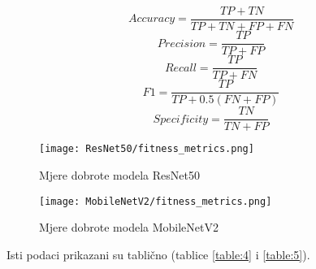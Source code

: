 \documentclass[conference, utf8]{IEEEtran}
\begin{document}
\begin{equation}
	Accuracy = \frac{TP + TN}{TP + TN + FP + FN} \label{eq:1}
\end{equation}
\begin{equation}
	Precision = \frac{TP}{TP + FP} \label{eq:2}
\end{equation}
\begin{equation}
	Recall = \frac{TP}{TP + FN} \label{eq:3}
\end{equation}
\begin{equation}
	F1 = \frac{TP}{TP + 0.5(FN + FP)}
\end{equation}
\begin{equation}
	Specificity = \frac{TN}{TN + FP} \label{eq:5}
\end{equation}


\begin{figure}[ht]
	\centering
	\texttt{[image: ResNet50/fitness\_metrics.png]}
	\caption{Mjere dobrote modela ResNet50}
	\label{fig:RN50_fit_met}
\end{figure}



\begin{figure}[ht]
  \centering
  \texttt{[image: MobileNetV2/fitness\_metrics.png]}
  \caption{Mjere dobrote modela MobileNetV2}
  \label{fig:MN_fit_met}
\end{figure}
\pagebreak
Isti podaci prikazani su tablično (tablice \ref{table:4} i \ref{table:5}).
\end{document}
